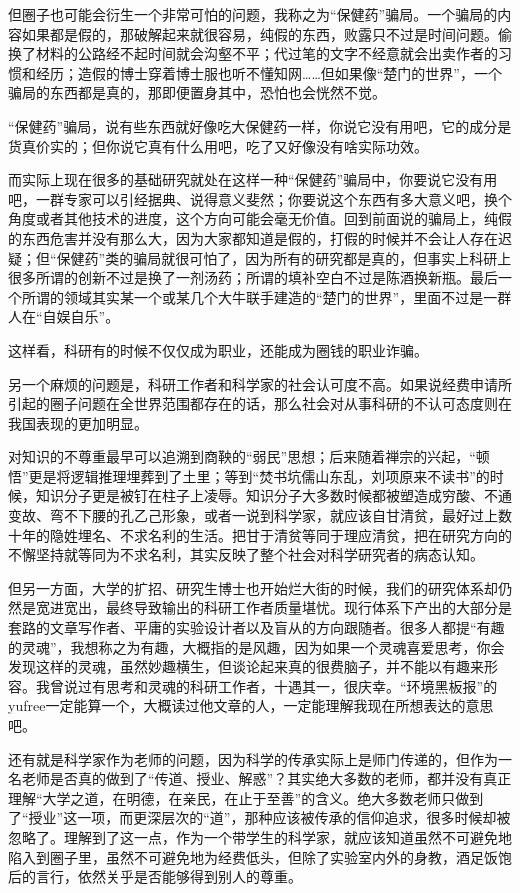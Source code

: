 \documentclass[]{book}
\begin{document}
但圈子也可能会衍生一个非常可怕的问题，我称之为``保健药''骗局。一个骗局的内容如果都是假的，那破解起来就很容易，纯假的东西，败露只不过是时间问题。偷换了材料的公路经不起时间就会沟壑不平；代过笔的文字不经意就会出卖作者的习惯和经历；造假的博士穿着博士服也听不懂知网\ldots{}\ldots{}但如果像``楚门的世界''，一个骗局的东西都是真的，那即便置身其中，恐怕也会恍然不觉。

``保健药''骗局，说有些东西就好像吃大保健药一样，你说它没有用吧，它的成分是货真价实的；但你说它真有什么用吧，吃了又好像没有啥实际功效。

而实际上现在很多的基础研究就处在这样一种``保健药''骗局中，你要说它没有用吧，一群专家可以引经据典、说得意义斐然；你要说这个东西有多大意义吧，换个角度或者其他技术的进度，这个方向可能会毫无价值。回到前面说的骗局上，纯假的东西危害并没有那么大，因为大家都知道是假的，打假的时候并不会让人存在迟疑；但``保健药''类的骗局就很可怕了，因为所有的研究都是真的，但事实上科研上很多所谓的创新不过是换了一剂汤药；所谓的填补空白不过是陈酒换新瓶。最后一个所谓的领域其实某一个或某几个大牛联手建造的``楚门的世界''，里面不过是一群人在``自娱自乐''。

这样看，科研有的时候不仅仅成为职业，还能成为圈钱的职业诈骗。

另一个麻烦的问题是，科研工作者和科学家的社会认可度不高。如果说经费申请所引起的圈子问题在全世界范围都存在的话，那么社会对从事科研的不认可态度则在我国表现的更加明显。

对知识的不尊重最早可以追溯到商鞅的``弱民''思想；后来随着禅宗的兴起，``顿悟''更是将逻辑推理埋葬到了土里；等到``焚书坑儒山东乱，刘项原来不读书''的时候，知识分子更是被钉在柱子上凌辱。知识分子大多数时候都被塑造成穷酸、不通变故、弯不下腰的孔乙己形象，或者一说到科学家，就应该自甘清贫，最好过上数十年的隐姓埋名、不求名利的生活。把甘于清贫等同于理应清贫，把在研究方向的不懈坚持就等同为不求名利，其实反映了整个社会对科学研究者的病态认知。

但另一方面，大学的扩招、研究生博士也开始烂大街的时候，我们的研究体系却仍然是宽进宽出，最终导致输出的科研工作者质量堪忧。现行体系下产出的大部分是套路的文章写作者、平庸的实验设计者以及盲从的方向跟随者。很多人都提``有趣的灵魂''，我想称之为有趣，大概指的是风趣，因为如果一个灵魂喜爱思考，你会发现这样的灵魂，虽然妙趣横生，但谈论起来真的很费脑子，并不能以有趣来形容。我曾说过有思考和灵魂的科研工作者，十遇其一，很庆幸。``环境黑板报''的yufree一定能算一个，大概读过他文章的人，一定能理解我现在所想表达的意思吧。

还有就是科学家作为老师的问题，因为科学的传承实际上是师门传递的，但作为一名老师是否真的做到了``传道、授业、解惑''？其实绝大多数的老师，都并没有真正理解``大学之道，在明德，在亲民，在止于至善''的含义。绝大多数老师只做到了``授业''这一项，而更深层次的``道''，那种应该被传承的信仰追求，很多时候却被忽略了。理解到了这一点，作为一个带学生的科学家，就应该知道虽然不可避免地陷入到圈子里，虽然不可避免地为经费低头，但除了实验室内外的身教，酒足饭饱后的言行，依然关乎是否能够得到别人的尊重。
\end{document}
